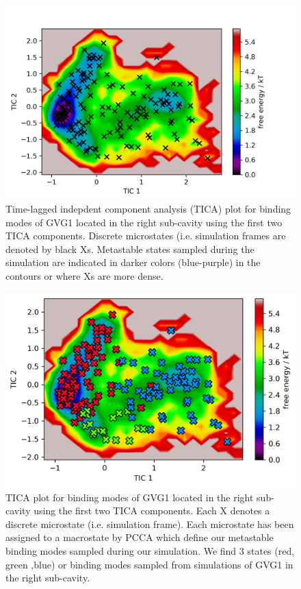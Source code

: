 \begin{figure}
    \centering
    \includegraphics{chapter6/Figures/GVG_1-right_c4-tica.png}
    \caption[TICA plots for GVG1]{Time-lagged indepdent component analysis (TICA) plot for binding modes of GVG1 located in the right sub-cavity using the first two TICA components. Discrete microstates (i.e. simulation frames are denoted by black Xs. Metastable states sampled during the simulation are indicated in darker colors (blue-purple) in the contours or where Xs are more dense.}
    \label{fig:GVG_1-right-tica}
\end{figure}

\begin{figure}
    \centering
    \includegraphics{chapter6/Figures/GVG_1-right-pcca.png}
    \caption[PCCA plot for GVG1]{TICA plot for binding modes of GVG1 located in the right sub-cavity using the first two TICA components. Each X denotes a discrete microstate (i.e. simulation frame). Each microstate has been assigned to a macrostate by PCCA which define our metastable binding modes sampled during our simulation. We find 3 states (red, green ,blue) or binding modes sampled from simulations of GVG1 in the right sub-cavity.}
    \label{fig:GVG_1-right-pcca}
\end{figure}

